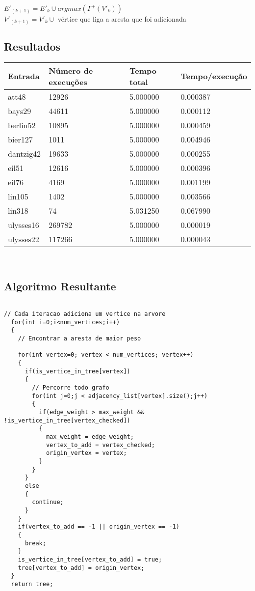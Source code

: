 \documentclass[12pt]{article}
\begin{document}
$E'_{(k+1)} = E'_k \cup {argmax(\Gamma^+(V'_k))}$\\
$V'_{(k+1)} = V'_k \cup$ vértice que liga a aresta que foi adicionada\\
\subsection{ Resultados }
\begin{tabular}{llll}
  \toprule
  \textbf{Entrada}  &  \textbf{Número de execuções} &   \textbf{Tempo total} &  \textbf{Tempo/execução} \\
  \midrule
att48     & 12926 & 5.000000 & 0.000387 \\
bays29    & 44611 & 5.000000 & 0.000112 \\
berlin52  & 10895 & 5.000000 & 0.000459 \\
bier127   & 1011 & 5.000000 & 0.004946 \\
dantzig42 & 19633 & 5.000000 & 0.000255 \\
eil51     & 12616 & 5.000000 & 0.000396 \\
eil76     & 4169 & 5.000000 & 0.001199 \\
lin105    & 1402 & 5.000000 & 0.003566 \\
lin318    & 74 & 5.031250 & 0.067990 \\
ulysses16 & 269782 & 5.000000 & 0.000019 \\
ulysses22 & 117266 & 5.000000 & 0.000043 \\

  \bottomrule 
\end{tabular}\\
\subsection{ Algoritmo Resultante }
\begin{lstlisting}

// Cada iteracao adiciona um vertice na arvore
  for(int i=0;i<num_vertices;i++)
  {
    // Encontrar a aresta de maior peso

    for(int vertex=0; vertex < num_vertices; vertex++)
    {
      if(is_vertice_in_tree[vertex])
      {
        // Percorre todo grafo
        for(int j=0;j < adjacency_list[vertex].size();j++)
        {
          if(edge_weight > max_weight && !is_vertice_in_tree[vertex_checked])
          {
            max_weight = edge_weight;
            vertex_to_add = vertex_checked;
            origin_vertex = vertex;
          }
        }
      }
      else
      {
        continue;
      }
    }
    if(vertex_to_add == -1 || origin_vertex == -1)
    {
      break;
    }
    is_vertice_in_tree[vertex_to_add] = true;
    tree[vertex_to_add] = origin_vertex;
  }
  return tree;
\end{lstlisting}
\end{document}
